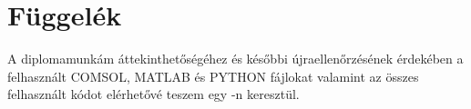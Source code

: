 \appendix\label{appendix}

\chapter*{Függelék}
\setcounter{chapter}{\appendixnumber}

A diplomamunkám áttekinthetőségéhez és későbbi újraellenőrzésének érdekében a felhasznált COMSOL, MATLAB és PYTHON fájlokat valamint az összes felhasznált kódot elérhetővé teszem egy \href{https://github.com/Dandubacsi/dipterv}{\color{blue}{github repository}}-n keresztül. 
